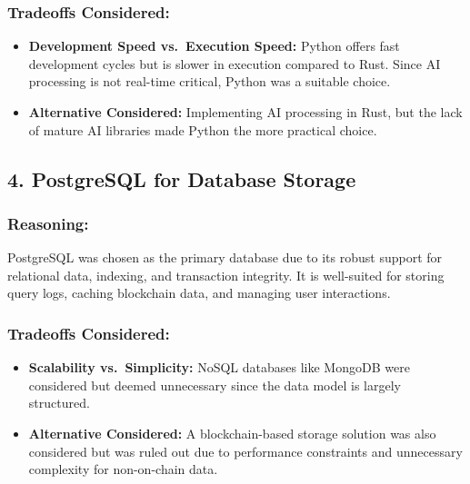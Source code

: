 \documentclass[
]{article}
\providecommand{\tightlist}{%
  \setlength{\itemsep}{0pt}\setlength{\parskip}{0pt}}
\begin{document}
\hypertarget{tradeoffs-considered-2}{%
\subsubsection{\texorpdfstring{\textbf{Tradeoffs
Considered:}}{Tradeoffs Considered:}}\label{tradeoffs-considered-2}}

\begin{itemize}
\tightlist
\item
  \textbf{Development Speed vs.~Execution Speed:} Python offers fast
  development cycles but is slower in execution compared to Rust. Since
  AI processing is not real-time critical, Python was a suitable choice.
\item
  \textbf{Alternative Considered:} Implementing AI processing in Rust,
  but the lack of mature AI libraries made Python the more practical
  choice.
\end{itemize}

\hypertarget{postgresql-for-database-storage}{%
\subsection{4. PostgreSQL for Database
Storage}\label{postgresql-for-database-storage}}

\hypertarget{reasoning-3}{%
\subsubsection{\texorpdfstring{\textbf{Reasoning:}}{Reasoning:}}\label{reasoning-3}}

PostgreSQL was chosen as the primary database due to its robust support
for relational data, indexing, and transaction integrity. It is
well-suited for storing query logs, caching blockchain data, and
managing user interactions.

\hypertarget{tradeoffs-considered-3}{%
\subsubsection{\texorpdfstring{\textbf{Tradeoffs
Considered:}}{Tradeoffs Considered:}}\label{tradeoffs-considered-3}}

\begin{itemize}
\tightlist
\item
  \textbf{Scalability vs.~Simplicity:} NoSQL databases like MongoDB were
  considered but deemed unnecessary since the data model is largely
  structured.
\item
  \textbf{Alternative Considered:} A blockchain-based storage solution
  was also considered but was ruled out due to performance constraints
  and unnecessary complexity for non-on-chain data.
\end{itemize}
\end{document}
